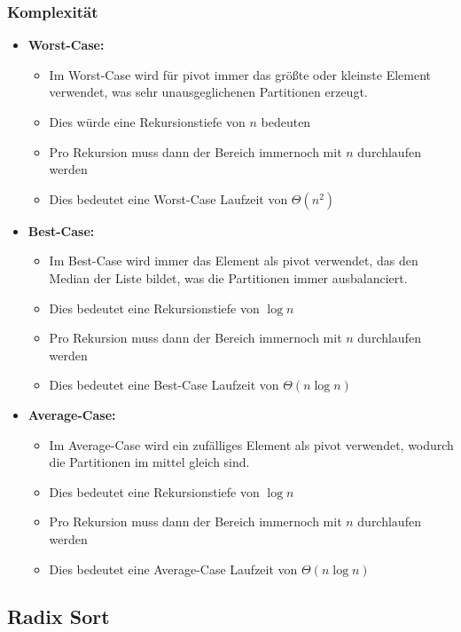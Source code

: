 \documentclass[
../../AuD-Zusammenfassung.tex,
]
{subfiles}
\begin{document}
\subsubsection{Komplexität}
\begin{itemize}
    \item \textbf{Worst-Case:}
    \begin{itemize}
        \item Im Worst-Case wird für pivot immer das größte oder kleinste Element verwendet, was sehr unausgeglichenen Partitionen erzeugt.
        \item Dies würde eine Rekursionstiefe von $n$ bedeuten
        \item Pro Rekursion muss dann der Bereich immernoch mit $n$ durchlaufen werden
        \item Dies bedeutet eine Worst-Case Laufzeit von $\Theta(n^2)$
    \end{itemize}
    \item \textbf{Best-Case:}
    \begin{itemize}
        \item Im Best-Case wird immer das Element als pivot verwendet, das den Median der Liste bildet, was die Partitionen immer ausbalanciert.
        \item Dies bedeutet eine Rekursionstiefe von $\log n$
        \item Pro Rekursion muss dann der Bereich immernoch mit $n$ durchlaufen werden
        \item Dies bedeutet eine Best-Case Laufzeit von $\Theta(n\log n)$
    \end{itemize}
    \item \textbf{Average-Case:}
    \begin{itemize}
        \item Im Average-Case wird ein zufälliges Element als pivot verwendet, wodurch die Partitionen im mittel gleich sind.
        \item Dies bedeutet eine Rekursionstiefe von $\log n$
        \item Pro Rekursion muss dann der Bereich immernoch mit $n$ durchlaufen werden
        \item Dies bedeutet eine Average-Case Laufzeit von $\Theta(n\log n)$
    \end{itemize}
\end{itemize}
\newpage
\subsection{Radix Sort}
\end{document}
